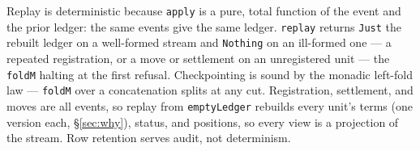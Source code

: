 \documentclass[11pt,a4paper]{article}
\begin{document}
Replay is deterministic because \texttt{apply} is a pure, total function of the
event and the prior ledger: the same events give the same ledger. \texttt{replay}
returns \texttt{Just} the rebuilt ledger on a well-formed stream and \texttt{Nothing}
on an ill-formed one --- a repeated registration, or a move or settlement on an
unregistered unit --- the \texttt{foldM} halting at the first refusal. Checkpointing is
sound by the monadic left-fold law --- \texttt{foldM} over a concatenation splits at
any cut. Registration, settlement, and moves are all events, so replay from
\texttt{emptyLedger} rebuilds every unit's terms (one version each, \S\ref{sec:why}),
status, and positions, so every view is a projection of the stream. Row
retention serves audit, not determinism.
\end{document}
